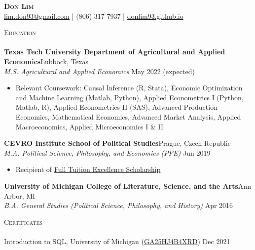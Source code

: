 \documentclass[a4paper,11pt]{article}
\newcommand{\lineunder} {
    \vspace*{-8pt} \\
    \hspace*{-18pt} \hrulefill \\
}
\newcommand{\header} [1] {
    {\hspace*{-18pt}\vspace*{6pt} \textsc{\large{#1}}}
    \vspace*{-6pt} \lineunder
}
\begin{document}
\vspace*{-40pt}

\vspace*{-10pt}
\begin{center}
    {\Huge \scshape \textbf{{Don Lim}}}\\
    \href{mailto:lim.don93@gmail.com}{lim.don93@gmail.com} | (806) 317-7937 | \href{https://donlim93.github.io/}{donlim93.github.io} \\
\end{center}

\header{Education}
\textbf{Texas Tech University Department of Agricultural and Applied Economics}\hfill Lubbock, Texas\\
\textit{M.S. Agricultural and Applied Economics} \hfill May 2022 (expected)\\
\begin{itemize}[noitemsep,nolistsep]
    \item Relevant Coursework: Causal Inference (R, Stata), Economic Optimization and Machine Learning (Matlab, Python), Applied Econometrics I (Python, Matlab, R), Applied Econometrics II (SAS), Advanced Production Economics, Mathematical Economics, Advanced Market Analysis, Applied Macroeconomics, Applied Microeconomics I \& II
\end{itemize}

\textbf{CEVRO Institute School of Political Studies}\hfill Prague, Czech Republic\\
\textit{M.A. Political Science, Philosophy, and Economics (PPE)} \hfill Jun 2019\\
\begin{itemize}[noitemsep,nolistsep]
    \item Recipient of \href{http://www.cevroinstitut.cz/en/article/scholarships/}{Full Tuition Excellence Scholarship}
\end{itemize}

\textbf{University of Michigan College of Literature, Science, and the Arts}\hfill Ann Arbor, MI\\
\textit{B.A. General Studies (Political Science, Philosophy, and History)} \hfill Apr 2016\\

\vspace{1mm}
\header{Certificates}


Introduction to SQL, University of Michigan (\href{https://coursera.org/verify/GA25HJ4B4XRD}{GA25HJ4B4XRD}) \hfill Dec 2021
\end{document}
